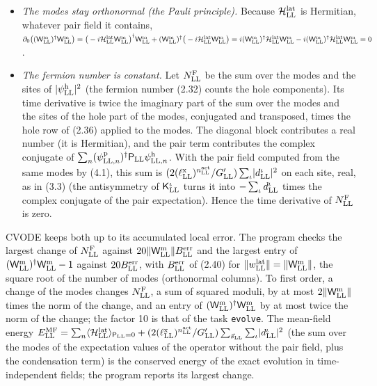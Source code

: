 \documentclass[
  10pt,
]{article}
\providecommand{\tightlist}{%
  \setlength{\itemsep}{0pt}\setlength{\parskip}{0pt}}
\begin{document}
\begin{itemize}
\tightlist
\item
  \emph{The modes stay orthonormal (the Pauli principle).} Because
  \(\mathcal H^{\rm lat}_{\rm LL}\) is Hermitian, whatever pair field it
  contains,
  \(\partial_0\big((\mathsf W^{\rm m}_{\rm LL})^\dagger\mathsf W^{\rm m}_{\rm LL}\big)=\big(-i\mathcal H^{\rm lat}_{\rm LL}\mathsf W^{\rm m}_{\rm LL}\big)^\dagger\mathsf W^{\rm m}_{\rm LL}+(\mathsf W^{\rm m}_{\rm LL})^\dagger\big(-i\mathcal H^{\rm lat}_{\rm LL}\mathsf W^{\rm m}_{\rm LL}\big)=i(\mathsf W^{\rm m}_{\rm LL})^\dagger\mathcal H^{\rm lat}_{\rm LL}\mathsf W^{\rm m}_{\rm LL}-i(\mathsf W^{\rm m}_{\rm LL})^\dagger\mathcal H^{\rm lat}_{\rm LL}\mathsf W^{\rm m}_{\rm LL}=0\).
\item
  \emph{The fermion number is constant.} Let \(N^{\rm F}_{\rm LL}\) be
  the sum over the modes and the sites of
  \(\lvert\psi^{\rm h}_{\rm LL}\rvert^2\) (the fermion number (2.32)
  counts the hole components). Its time derivative is twice the
  imaginary part of the sum over the modes and the sites of the hole
  part of the modes, conjugated and transposed, times the hole row of
  (2.36) applied to the modes. The diagonal block contributes a real
  number (it is Hermitian), and the pair term contributes the complex
  conjugate of
  \(\sum_n(\psi^{\rm p}_{{\rm LL},n})^\dagger\mathsf P_{\rm LL}\psi^{\rm h}_{{\rm LL},n}\).
  With the pair field computed from the same modes by (4.1), this sum is
  \((2(\ell^{\rm x}_{\rm LL})^{n^{\rm act}_{\rm LL}}/G'_{\rm LL})\sum_\iota\lvert d^\iota_{\rm LL}\rvert^2\)
  on each site, real, as in (3.3) (the antisymmetry of
  \(\mathsf K^\iota_{\rm LL}\) turns it into
  \(-\sum_\iota d^\iota_{\rm LL}\) times the complex conjugate of the
  pair expectation). Hence the time derivative of \(N^{\rm F}_{\rm LL}\)
  is zero.
\end{itemize}

CVODE keeps both up to its accumulated local error. The program checks
the largest change of \(N^{\rm F}_{\rm LL}\) against
\(20\lVert\mathsf W^{\rm m}_{\rm LL}\rVert B^{\rm err}_{\rm LL}\) and
the largest entry of
\((\mathsf W^{\rm m}_{\rm LL})^\dagger\mathsf W^{\rm m}_{\rm LL}-\mathsf 1\)
against \(20B^{\rm err}_{\rm LL}\), with \(B^{\rm err}_{\rm LL}\) of
(2.40) for
\(\lVert w^{\rm lat}_{\rm LL}\rVert=\lVert\mathsf W^{\rm m}_{\rm LL}\rVert\),
the square root of the number of modes (orthonormal columns). To first
order, a change of the modes changes \(N^{\rm F}_{\rm LL}\), a sum of
squared moduli, by at most \(2\lVert\mathsf W^{\rm m}_{\rm LL}\rVert\)
times the norm of the change, and an entry of
\((\mathsf W^{\rm m}_{\rm LL})^\dagger\mathsf W^{\rm m}_{\rm LL}\) by at
most twice the norm of the change; the factor 10 is that of the task
\texttt{evolve}. The mean-field energy
\(E^{\rm MF}_{\rm LL}=\sum_n\langle\mathcal H^{\rm lat}_{\rm LL}\rangle_{\mathsf P_{\rm LL}=0}+(2(\ell^{\rm x}_{\rm LL})^{n^{\rm act}_{\rm LL}}/G'_{\rm LL})\sum_{\vec s_{\rm LL}}\sum_\iota\lvert d^\iota_{\rm LL}\rvert^2\)
(the sum over the modes of the expectation values of the operator
without the pair field, plus the condensation term) is the conserved
energy of the exact evolution in time-independent fields; the program
reports its largest change.
\end{document}
